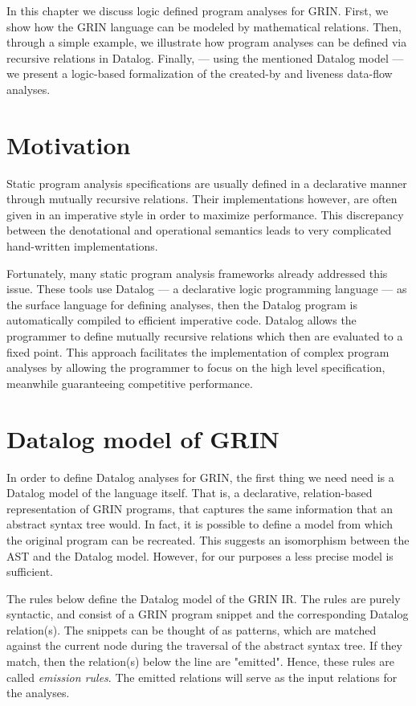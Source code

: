 \documentclass[main.tex]{subfiles}
\begin{document}
  In this chapter we discuss logic defined program analyses for GRIN. First, we show how the GRIN language can be modeled by mathematical relations. Then, through a simple example, we illustrate how program analyses can be defined via recursive relations in Datalog. Finally, --- using the mentioned Datalog model --- we present a logic-based formalization of the created-by and liveness data-flow analyses.

	\section{Motivation}
	
	Static program analysis specifications are usually defined in a declarative manner through mutually recursive relations. Their implementations however, are often given in an imperative style in order to maximize performance. This discrepancy between the denotational and operational semantics leads to very complicated hand-written implementations.
	
	Fortunately, many static program analysis frameworks \cite{doop, cclyzer, souffle-2} already addressed this issue. These tools use Datalog --- a declarative logic programming language --- as the surface language for defining analyses, then the Datalog program is automatically compiled to efficient imperative code. Datalog allows the programmer to define mutually recursive relations which then are evaluated to a fixed point. This approach facilitates the implementation of complex program analyses by allowing the programmer to focus on the high level specification, meanwhile guaranteeing competitive performance.

  \section{Datalog model of GRIN} \label{sec:datalog-model}
  
  In order to define Datalog analyses for GRIN, the first thing we need need is a Datalog model of the language itself. That is, a declarative, relation-based representation of GRIN programs, that captures the same information that an abstract syntax tree would. In fact, it is possible to define a model from which the original program can be recreated. This suggests an isomorphism between the AST and the Datalog model. However, for our purposes a less precise model is sufficient. 
  
  The rules below define the Datalog model of the GRIN IR. The rules are purely syntactic, and consist of a GRIN program snippet and the corresponding Datalog relation(s). The snippets can be thought of as patterns, which are matched against the current node during the traversal of the abstract syntax tree. If they match, then the relation(s) below the line are "emitted". Hence, these rules are called \emph{emission rules}. The emitted relations will serve as the input relations for the analyses.
  
\end{document}

